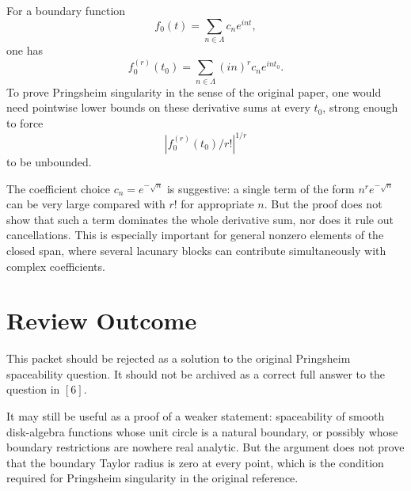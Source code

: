 \documentclass[11pt]{article}
\begin{document}
For a boundary function
\[
  f_0(t)=\sum_{n\in\Lambda} c_n e^{int},
\]
one has
\[
  f_0^{(r)}(t_0)
  =
  \sum_{n\in\Lambda} (in)^r c_n e^{int_0}.
\]
To prove Pringsheim singularity in the sense of the original paper, one would
need pointwise lower bounds on these derivative sums at every \(t_0\), strong
enough to force
\[
  \left|f_0^{(r)}(t_0)/r!\right|^{1/r}
\]
to be unbounded.

The coefficient choice \(c_n=e^{-\sqrt n}\) is suggestive: a single term of
the form \(n^r e^{-\sqrt n}\) can be very large compared with \(r!\) for
appropriate \(n\). But the proof does not show that such a term dominates the
whole derivative sum, nor does it rule out cancellations. This is especially
important for general nonzero elements of the closed span, where several
lacunary blocks can contribute simultaneously with complex coefficients.

\section*{Review Outcome}

This packet should be rejected as a solution to the original Pringsheim
spaceability question. It should not be archived as a correct full answer to
the question in \([6]\).

It may still be useful as a proof of a weaker statement: spaceability of
smooth disk-algebra functions whose unit circle is a natural boundary, or
possibly whose boundary restrictions are nowhere real analytic. But the
argument does not prove that the boundary Taylor radius is zero at every
point, which is the condition required for Pringsheim singularity in the
original reference.
\end{document}
